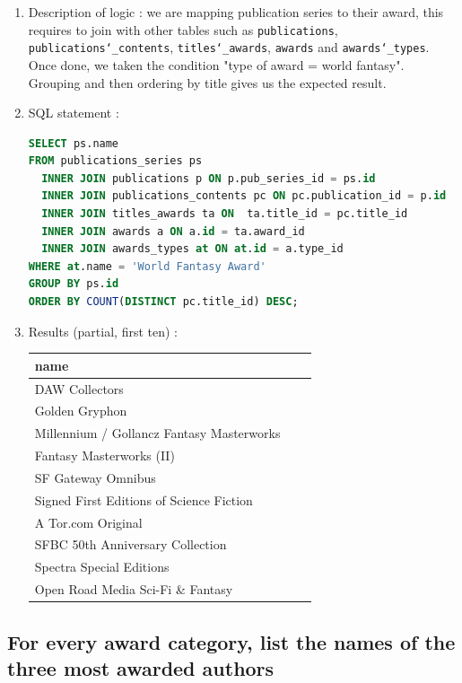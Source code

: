 \documentclass[doubleside, titlepage]{article}
\begin{document}
	\begin{enumerate}
	\item Description of logic : we are mapping publication series to their award, this requires to join with other tables such as \texttt{publications}, \texttt{publications\char`_contents}, \texttt{titles\char`_awards}, \texttt{awards} and \texttt{awards\char`_types}. Once done, we taken the condition "type of award = world fantasy". Grouping and then ordering by title gives us the expected result.
	\item SQL statement :
		\begin{lstlisting}[language=SQL,showspaces=false,basicstyle=\ttfamily,numberstyle=\tiny,commentstyle=\color{gray}]
SELECT ps.name
FROM publications_series ps
  INNER JOIN publications p ON p.pub_series_id = ps.id
  INNER JOIN publications_contents pc ON pc.publication_id = p.id
  INNER JOIN titles_awards ta ON  ta.title_id = pc.title_id
  INNER JOIN awards a ON a.id = ta.award_id
  INNER JOIN awards_types at ON at.id = a.type_id
WHERE at.name = 'World Fantasy Award'
GROUP BY ps.id
ORDER BY COUNT(DISTINCT pc.title_id) DESC;
		\end{lstlisting}

	\item Results (partial, first ten) :\\

	\begin{tabular}{|l|c|r|}
	  \hline
		name \\
	  \hline
		DAW Collectors\\
		Golden Gryphon\\
		Millennium / Gollancz Fantasy Masterworks\\
		Fantasy Masterworks (II)\\
		SF Gateway Omnibus\\
		Signed First Editions of Science Fiction\\
		A Tor.com Original\\
		SFBC 50th Anniversary Collection\\
		Spectra Special Editions\\
		Open Road Media Sci-Fi \& Fantasy\\
	  \hline
	\end{tabular}
\end{enumerate}

\subsection{For every award category, list the names of the three most awarded authors}
\end{document}
